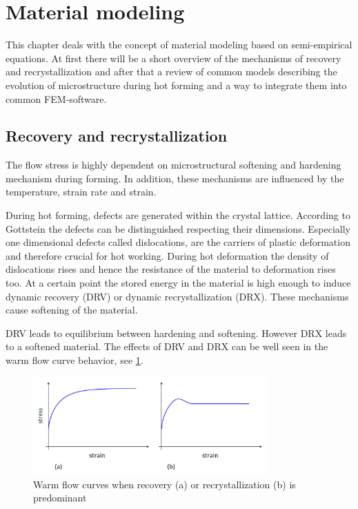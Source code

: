 \section{Material modeling}
This chapter deals with the concept of material modeling based on semi-empirical equations. At first there will be a short overview of the mechanisms of recovery and recrystallization and after that a review of common models describing the evolution of microstructure during hot forming and a way to integrate them into common FEM-software.\par 

\subsection{Recovery and recrystallization}
The flow stress is highly dependent on microstructural softening and hardening mechanism during forming. In addition, these mechanisms are influenced by the temperature, strain rate and strain.\par 

During hot forming, defects are generated within the crystal lattice. According to Gottstein \cite{GOT07} the defects can be distinguished respecting their dimensions. Especially one dimensional defects called dislocations, are the carriers of plastic deformation and therefore crucial for hot working. During hot deformation the density of dislocations rises and hence the resistance of the material to deformation rises too. At a certain point the stored energy in the material is high enough to induce dynamic recovery (DRV) or dynamic recrystallization (DRX). These mechanisms cause softening of the material.\par 

DRV leads to equilibrium between hardening and softening. However DRX leads to a softened material. The effects of DRV and DRX can be well seen in the warm flow curve behavior, see \ref{img:warmflowcurves}.

\begin{figure}[htbp]
 \centering
 \includegraphics[width=0.8\textwidth]{images/warmflowcurves}
 \caption{Warm flow curves when recovery (a) or recrystallization (b) is predominant \cite{LOH10}}
 \label{img:warmflowcurves}
\end{figure}

